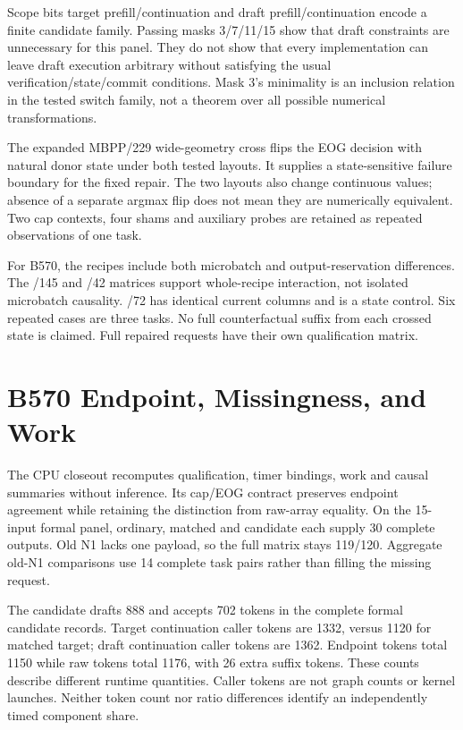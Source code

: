 \documentclass{article}
\begin{document}
Scope bits target prefill/continuation and draft prefill/continuation encode a finite candidate family. Passing masks 3/7/11/15 show that draft constraints are unnecessary for this panel. They do not show that every implementation can leave draft execution arbitrary without satisfying the usual verification/state/commit conditions. Mask 3's minimality is an inclusion relation in the tested switch family, not a theorem over all possible numerical transformations.

The expanded MBPP/229 wide-geometry cross flips the EOG decision with natural donor state under both tested layouts. It supplies a state-sensitive failure boundary for the fixed repair. The two layouts also change continuous values; absence of a separate argmax flip does not mean they are numerically equivalent. Two cap contexts, four shams and auxiliary probes are retained as repeated observations of one task.

For B570, the recipes include both microbatch and output-reservation differences. The /145 and /42 matrices support whole-recipe interaction, not isolated microbatch causality. /72 has identical current columns and is a state control. Six repeated cases are three tasks. No full counterfactual suffix from each crossed state is claimed. Full repaired requests have their own qualification matrix.

\section{B570 Endpoint, Missingness, and Work}
The CPU closeout recomputes qualification, timer bindings, work and causal summaries without inference. Its cap/EOG contract preserves endpoint agreement while retaining the distinction from raw-array equality. On the 15-input formal panel, ordinary, matched and candidate each supply 30 complete outputs. Old N1 lacks one payload, so the full matrix stays 119/120. Aggregate old-N1 comparisons use 14 complete task pairs rather than filling the missing request.

The candidate drafts 888 and accepts 702 tokens in the complete formal candidate records. Target continuation caller tokens are 1332, versus 1120 for matched target; draft continuation caller tokens are 1362. Endpoint tokens total 1150 while raw tokens total 1176, with 26 extra suffix tokens. These counts describe different runtime quantities. Caller tokens are not graph counts or kernel launches. Neither token count nor ratio differences identify an independently timed component share.
\end{document}
